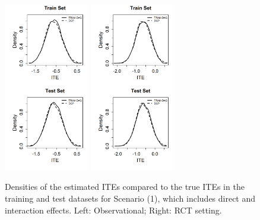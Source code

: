 \begin{figure}[htbp]
\centering
\includegraphics[width=0.33\textwidth]{img/results/observ_scenario1_ITE_densities_train_test.png} 
\includegraphics[width=0.33\textwidth]{img/results/rct_scenario1_ITE_densities_train_test.png}
\vspace{-17pt}
\caption{Densities of the estimated ITEs compared to the true ITEs in the training and test datasets for Scenario (1), which includes direct and interaction effects. Left: Observational; Right: RCT setting.}
\label{fig:scenario1_ite_densities_train_test}
\end{figure}






